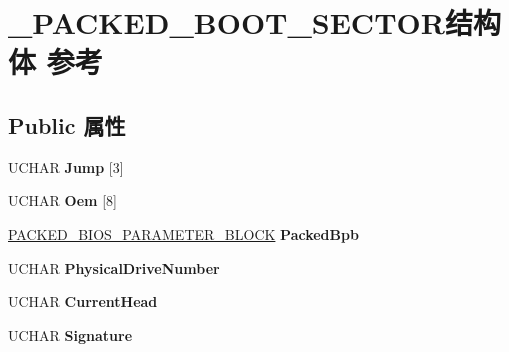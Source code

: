 \hypertarget{struct___p_a_c_k_e_d___b_o_o_t___s_e_c_t_o_r}{}\section{\+\_\+\+P\+A\+C\+K\+E\+D\+\_\+\+B\+O\+O\+T\+\_\+\+S\+E\+C\+T\+O\+R结构体 参考}
\label{struct___p_a_c_k_e_d___b_o_o_t___s_e_c_t_o_r}
\subsection*{Public 属性}
\begin{DoxyCompactItemize}
\item 
\mbox{\label{struct___p_a_c_k_e_d___b_o_o_t___s_e_c_t_o_r_a5e6728e40521a91b847eac1506e94837}} 
U\+C\+H\+AR {\bfseries Jump} \mbox{[}3\mbox{]}
\item 
\mbox{\label{struct___p_a_c_k_e_d___b_o_o_t___s_e_c_t_o_r_a790716c3508f93c47847a0c2c37cbba8}} 
U\+C\+H\+AR {\bfseries Oem} \mbox{[}8\mbox{]}
\item 
\mbox{\label{struct___p_a_c_k_e_d___b_o_o_t___s_e_c_t_o_r_ae143ea199af16839c830d900dbd77294}} 
\hyperlink{struct___p_a_c_k_e_d___b_i_o_s___p_a_r_a_m_e_t_e_r___b_l_o_c_k}{P\+A\+C\+K\+E\+D\+\_\+\+B\+I\+O\+S\+\_\+\+P\+A\+R\+A\+M\+E\+T\+E\+R\+\_\+\+B\+L\+O\+CK} {\bfseries Packed\+Bpb}
\item 
\mbox{\label{struct___p_a_c_k_e_d___b_o_o_t___s_e_c_t_o_r_ab9ae69a9a50d56285cb31bfd3263f2f4}} 
U\+C\+H\+AR {\bfseries Physical\+Drive\+Number}
\item 
\mbox{\label{struct___p_a_c_k_e_d___b_o_o_t___s_e_c_t_o_r_a3d9879504ecc61a4dac24c1f2da2dc3e}} 
U\+C\+H\+AR {\bfseries Current\+Head}
\item 
\mbox{\label{struct___p_a_c_k_e_d___b_o_o_t___s_e_c_t_o_r_ac51bcd24a594967f8bb900707577fa79}} 
U\+C\+H\+AR {\bfseries Signature}
\item 

\end{DoxyCompactItemize}
